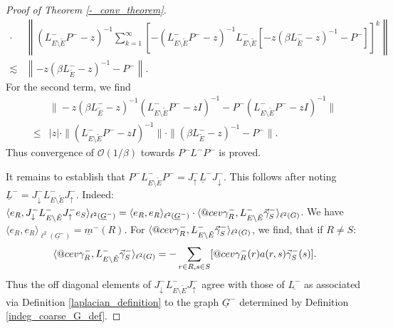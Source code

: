 \documentclass[reqno,12pt,letterpaper]{amsart}
\makeatletter
\numberwithin{equation}{section}
\newcommand{\Lin}{L^{-}}
\DeclareRobustCommand{\cev}[1]{%
	\mathpalette\do@cev{#1}%
}
\newcommand{\do@cev}[2]{%
	\fix@cev{#1}{+}%
	\reflectbox{$\m@th#1\vec{\reflectbox{$\fix@cev{#1}{-}\m@th#1#2\fix@cev{#1}{+}$}}$}%
	\fix@cev{#1}{-}%
}
\newcommand{\fix@cev}[2]{%
	\ifx#1\displaystyle
	\mkern#23mu
	\else
	\ifx#1\textstyle
	\mkern#23mu
	\else
	\ifx#1\scriptstyle
	\mkern#22mu
	\else
	\mkern#22mu
	\fi
	\fi
	\fi
}
\newcommand{\1}{\mathds{1}}
\theoremstyle{definition}
\makeatother
\begin{document}
\begin{proof}[Proof of Theorem \ref{-_conv_theorem}]
\begin{align}
		\cdot&
		\left\|(\Lin_{E \setminus \tilde{E}} P^- -z )^{-1} \sum\limits_{k = 1}^{\infty} \left[-(\Lin_{E \setminus \tilde{E}} P^- -z )^{-1} \Lin_{E \setminus \tilde{E}}  \left[-z (\beta \Lin_{\tilde{E}} -z)^{-1}- P^-\right]\right]^k\right\| \\
		\lesssim & 	 \left\|-z (\beta \Lin_{\tilde{E}} -z)^{-1}- P^-\right\|.
	\end{align}
	For the second term, we find 
	\begin{align}
		&	\|  -z(\beta \Lin_{\tilde{E}} -z)^{-1}( \Lin_{E \setminus \tilde{E}} P^- - z I)^{-1}  
		-  P^- ( \Lin_{E \setminus \tilde{E}} P^- - z I)^{-1}    \| \\
		\leq &
		|z|	\cdot \|( \Lin_{E \setminus \tilde{E}} P^- - z I)^{-1}  \| \cdot \|  (\beta \Lin_{\tilde{E}} -z)^{-1}
		-  P^-   \|.
	\end{align}	 
	Thus convergence of $\mathcal{O}(1/\beta)$ towards $P^- \Lin P^-$ is proved.
	
	\medskip		 
	It remains to establish	that
	$P^- \Lin_{E \setminus \tilde{E}} P^- = J^-_{\uparrow} \underline{L}^- J^-_{\downarrow}$. 	This follows after noting $\underline{L}^- = J^-_{\downarrow} \Lin_{E\setminus \tilde{E}}  J^-_\uparrow$.	 Indeed:
	$
	\langle e_R, J^-_{\downarrow} \Lin_{E\setminus \tilde{E}}  J^-_\uparrow e_S\rangle_{\ell^2(\underline{G}^-)} = \langle e_R, e_R\rangle_{\ell^2(\underline{G}^-)}\cdot
	\langle\cev{\gamma}^-_R,  \Lin_{E\setminus \tilde{E}} \vec{\gamma}^-_S \rangle_{\ell^2(G)}$.
	We have $ \langle e_R, e_R\rangle_{\ell^2(\underline{G}^-)} =  \underline{m}^-(R) $.  For $\langle\cev{\gamma}^-_R,  \Lin_{E\setminus \tilde{E}} \vec{\gamma}^-_S \rangle_{\ell^2(G)}$, we find, that if $R \neq S$:
	\begin{align}
		\langle\cev{\gamma}^-_R,  \Lin_{E\setminus \tilde{E}} \vec{\gamma}^-_S \rangle_{\ell^2(G)} = - 	\sum\limits_{r \in R, s \in S} 
		[
		\cev{\gamma}^{-}_{R}(r)
		a(r,s)
		\vec{\gamma}_S^{-}(s)
		].
	\end{align}
	Thus the off diagonal elements of $J^-_{\downarrow} \Lin_{E\setminus \tilde{E}}  J^-_\uparrow $ agree with those of $\underline{\Lin}$ as associated via Definition \ref{laplacian_definition} to the graph $\underline{G}^-$ determined by Definition \ref{indeg_coarse_G_def}.
	

\end{proof}
\end{document}
